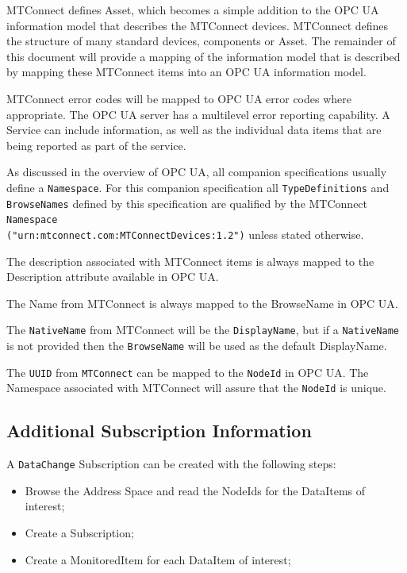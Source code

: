 \documentclass{mtconnect}	%
\begin{document}
MTConnect defines Asset, which becomes a simple addition to the OPC UA information model that describes the MTConnect devices. MTConnect defines the structure of many standard devices, components or Asset. The remainder of this document will provide a mapping of the information model that is described by mapping these MTConnect items into an OPC UA information model.

MTConnect error codes will be mapped to OPC UA error codes where appropriate. The OPC UA server has a multilevel error reporting capability. A Service can include  	 information, as well as the individual data items that are being reported as part of the service.

As discussed in the overview of OPC UA, all companion specifications usually define a \texttt{Namespace}. For this companion specification all \texttt{TypeDefinitions} and \texttt{BrowseNames} defined by this specification are qualified by the MTConnect \texttt{Namespace} \\
\texttt{("urn:mtconnect.com:MTConnectDevices:1.2")} unless stated otherwise.

The description associated with MTConnect items is always mapped to the Description attribute available in OPC UA.

The Name from MTConnect is always mapped to the BrowseName in OPC UA.

The \texttt{NativeName} from MTConnect will be the \texttt{DisplayName}, but if a \texttt{NativeName} is not provided then the \texttt{BrowseName} will be used as the default DisplayName.

The \texttt{UUID} from \texttt{MTConnect} can be mapped to the \texttt{NodeId} in OPC UA. The Namespace associated with MTConnect will assure that the \texttt{NodeId} is unique.

\FloatBarrier
\subsection{Additional Subscription Information}

A \texttt{DataChange} Subscription can be created with the following steps:

\begin{itemize}
\item Browse the Address Space and read the NodeIds for the DataItems of interest;
\item Create a Subscription;
\item Create a MonitoredItem for each DataItem of interest;
\end{itemize}
\end{document}
